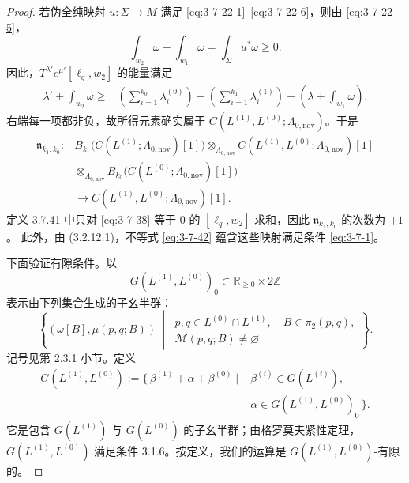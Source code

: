 \begin{proof}
若伪全纯映射 $u\colon\Sigma\to M$ 满足
\eqref{eq:3-7-22-1}--\eqref{eq:3-7-22-6}，则由
\eqref{eq:3-7-22-5}，
\[
 \int_{w_2}\omega-\int_{w_1}\omega
 =\int_\Sigma u^*\omega\geq0.
\]
因此，$T^{\lambda'}e^{\mu'}[\ell_q,w_2]$ 的能量满足
\begin{equation}
\begin{aligned}
 \lambda'+\int_{w_2}\omega
 \geq{}&
 \left(\sum_{i=1}^{k_0}\lambda_i^{(0)}\right)
 +\left(\sum_{i=1}^{k_1}\lambda_i^{(1)}\right)
 +\left(\lambda+\int_{w_1}\omega\right).
\end{aligned}
\tag{3.7.42}\label{eq:3-7-42}
\end{equation}
右端每一项都非负，故所得元素确实属于
$C(L^{(1)},L^{(0)};\Lambda_{0,\mathrm{nov}})$。于是
\[
\begin{aligned}
\mathfrak n_{k_1,k_0}\colon{}&
B_{k_1}\bigl(C(L^{(1)};\Lambda_{0,\mathrm{nov}})[1]\bigr)
\otimes_{\Lambda_{0,\mathrm{nov}}}
C(L^{(1)},L^{(0)};\Lambda_{0,\mathrm{nov}})[1]\\
&\otimes_{\Lambda_{0,\mathrm{nov}}}
B_{k_0}\bigl(C(L^{(0)};\Lambda_{0,\mathrm{nov}})[1]\bigr)\\
&\longrightarrow
C(L^{(1)},L^{(0)};\Lambda_{0,\mathrm{nov}})[1].
\end{aligned}
\]
定义 3.7.41 中只对 \eqref{eq:3-7-38} 等于 $0$ 的
$[\ell_q,w_2]$ 求和，因此 $\mathfrak n_{k_1,k_0}$ 的次数为 $+1$。
此外，由 (3.2.12.1)，不等式 \eqref{eq:3-7-42} 蕴含这些映射满足条件
\eqref{eq:3-7-1}。

下面验证有隙条件。以
\[
 G(L^{(1)},L^{(0)})_0
 \subset\mathbb R_{\geq0}\times2\mathbb Z
\]
表示由下列集合生成的子幺半群：
\[
 \left\{
  (\omega[B],\mu(p,q;B))
  \ \middle|\
  \begin{gathered}
   p,q\in L^{(0)}\cap L^{(1)},\quad B\in\pi_2(p,q),\\
   \mathcal M(p,q;B)\ne\varnothing
  \end{gathered}
 \right\}.
\]
记号见第 2.3.1 小节。定义
\begin{equation}
\begin{aligned}
 G(L^{(1)},L^{(0)})
 :=\{\,\beta^{(1)}+\alpha+\beta^{(0)}
 \mid{}&
 \beta^{(i)}\in G(L^{(i)}),\\
 &\alpha\in G(L^{(1)},L^{(0)})_0\,\}.
\end{aligned}
\tag{3.7.43}\label{eq:3-7-43}
\end{equation}
它是包含 $G(L^{(1)})$ 与 $G(L^{(0)})$ 的子幺半群；由格罗莫夫紧性定理，
$G(L^{(1)},L^{(0)})$ 满足条件 3.1.6。按定义，我们的运算是
$G(L^{(1)},L^{(0)})$-有隙的。


\end{proof}
